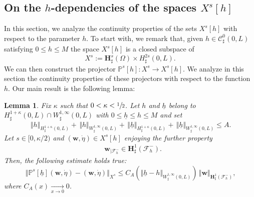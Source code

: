 \documentclass[10pt]{amsart}
\let\mathcal\mathscr
\newtheorem{lemma}[theorem]{Lemma}
\theoremstyle{remark}
\theoremstyle{definition}
\newcommand{\norme}[1]{\,\Vert #1\Vert}
\newcommand{\vnorme}[1]{\Vert #1\Vert}
\newcommand{\wg}{\boldsymbol{w}}
\newcommand{\BS}[1]{\boldsymbol{#1}}
\newcommand{\etap}{\dot{\eta}}
\newcommand{\hb}{{\underline{h}}}
\begin{document}
\subsection{On the $h$-dependencies of the spaces $X^s[h]$}
\label{continuite_h}
In this section, we analyze the continuity properties of the sets $X^s[h]$ with respect to the parameter $h$.
To start with, we remark that, given $h \in \mathcal{C}^0_{\sharp}(0,L)$ satisfying $0 \leq h \leq M$ the space
$X^s[h]$ is a closed subspace of
\[
X^s := \BS{H}^s_{\sharp}(\Omega) \times H^{2s}_{\sharp}(0,L).
\]
We can then construct the projector $\mathbb P^s[h] : X^s \to X^s[h]$. We analyze in this section the continuity
properties of these projectors with respect to the function $h$. Our main result is the following lemma:

\begin{lemma} \label{lem:projector}
Fix $\kappa$ such that $0<\kappa<\sfrac{1}{2}$. Let $h$ and $\hb$ belong to $H_\sharp^{1+\kappa}(0,L)\cap W_\sharp^{1,\infty}(0,L)$ with $0\leq \hb\leq h\leq M$ and set
\begin{equation}
\label{borne:A}\norme{h}_{H^{1+\kappa}_{\sharp}(0,L)}+\norme{h}_{W^{1,\infty}_{\sharp}(0,L)}+\norme{\hb}_{H^{1+\kappa}_{\sharp}(0,L)}+\norme{\hb}_{W^{1,\infty}_{\sharp}(0,L)}\leq A.
\end{equation}
Let $s \in [0,\kappa/2)$ and $(\wg,\etap) \in X^s[h]$ enjoying the further property
\begin{eqnarray}
&\wg_{\vert\mathcal{F}_{h}^{-}}\in \BS{H}^{1}_{\sharp}(\mathcal{F}^{-}_{h}).\label{hyp-Ps2}
\end{eqnarray}
Then, the following estimate holds true:
\begin{equation}\label{est.projector.main}
\norme{\mathbb{P}^{s}[\hb](\wg,\etap) -(\wg,\etap)}_{X^s}\leq C_{A}(\vnorme{\hb -h }_{W^{1,\infty}_{\sharp}(0,L)})\norme{\wg}_{\BS{H}^{1}_{\sharp}(\mathcal{F}^{-}_{h})},
\end{equation}
where $C_{A}(x)\underset{x\to 0}{\to}0$.
\end{lemma}
\end{document}
